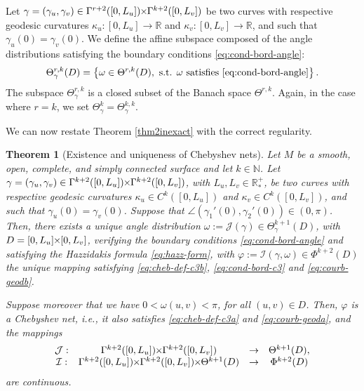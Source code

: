 \documentclass{article}
\newcommand{\I}{\mathcal{I}}
\newcommand{\PLH}{{\mkern-1mu\times\mkern-1mu}}
\newcommand{\Times}{\PLH}
\newcommand{\R}{\mathbb{R}}
\newcommand{\surf}{M}
\newcommand{\EN}{\mathbb{N}}
\newcommand{\ko}{\kappa}
\newcommand{\ds}{\mathrm{d}s}
\newcommand{\J}{\mathcal{J}}
\newtheorem{theorem}{Theorem}
\theoremstyle{remark}
\theoremstyle{prpart}
\begin{document}
Let $\gamma=(\gamma_u,\gamma_v)\in\Gamma^{r+2}([0,L_u])\Times \Gamma^{k+2}([0,L_v])$ be two curves with respective geodesic curvatures $\ko_u:[0,L_u]\to\R$ and $\ko_v:[0,L_v]\to\R$, and such that $\gamma_u(0)=\gamma_v(0)$. We define the affine subspace composed of the angle distributions satisfying the boundary conditions \eqref{eq:cond-bord-angle}:
\begin{equation*}  
    \Theta_{\gamma}^{r,k}(D) =
    \left\{ 
      \omega \in \Theta^{r,k}(D),
\text{ s.t. $\omega$ satisfies \eqref{eq:cond-bord-angle}}\right\}.
\end{equation*}
The subspace $\Theta^{r,k}_{\gamma}$ is a closed subset of the Banach space $\Theta^{r,k}$. Again, in the case where $r=k$, we set $\Theta_{\gamma}^k=\Theta_{\gamma}^{k,k}$.

We can now restate Theorem \ref{thm2inexact} with the correct regularity.
\begin{theorem}[Existence and uniqueness of Chebyshev nets]\label{thm2}
Let $\surf$ be a smooth, open, complete, and simply connected surface and let $k\in\EN$. Let $\gamma=(\gamma_u,\gamma_v)\in\Gamma^{k+2}([0,L_u])\Times\Gamma^{k+2}([0,L_v])$, with $L_u,L_v\in\R_\ast^+$, be two curves with respective geodesic curvatures $\ko_u\in C^k([0,L_u])$ and $\ko_v\in C^k([0,L_v])$, and such that $\gamma_u(0) = \gamma_v(0)$. Suppose that $\angle(\gamma_1'(0),\gamma_2'(0))\in(0,\pi)$. Then, there exists a unique angle distribution $\omega:=\J(\gamma) \in \Theta^{k+1}_{\gamma}(D)$, with $D=[0,L_u]\Times[0,L_v]$, verifying the boundary conditions \eqref{eq:cond-bord-angle} and satisfying the Hazzidakis formula \eqref{eq:hazz-form}, with $\varphi:=\I(\gamma,\omega)\in\Phi^{k+2}(D)$ the unique mapping satisfying \eqref{eq:cheb-def-c3b}, \eqref{eq:cond-bord-c3} and \eqref{eq:courb-geodb}. 

Suppose moreover that we have $0<\omega(u,v)<\pi$, for all $(u,v)\in D$. Then, $\varphi$ is a Chebyshev net, i.e., it also satisfies \eqref{eq:cheb-def-c3a} and \eqref{eq:courb-geoda}, and the mappings
\begin{equation*}
\begin{array}{cccc}
\J:&\Gamma^{k+2}([0,L_u])\Times\Gamma^{k+2}([0,L_v])&\to&\Theta^{k+1}(D),\\
  \I:&\Gamma^{k+2}([0,L_u])\Times\Gamma^{k+2}([0,L_v])\Times\Theta^{k+1}(D)&\to&\Phi^{k+2}(D)
\end{array}
\end{equation*}
are continuous.
\end{theorem}
\end{document}
